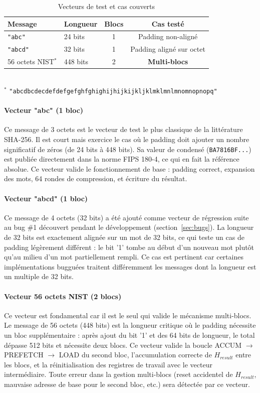 \begin{table}[H]
\centering
\caption{Vecteurs de test et cas couverts}
\label{tab:vectors}
\begin{tabular}{llcc}
\toprule
\textbf{Message} & \textbf{Longueur} & \textbf{Blocs} & \textbf{Cas testé} \\
\midrule
\texttt{"abc"} & 24 bits & 1 & Padding non-aligné \\
\texttt{"abcd"} & 32 bits & 1 & Padding aligné sur octet \\
56 octets NIST$^*$ & 448 bits & 2 & \textbf{Multi-blocs} \\
\bottomrule
\end{tabular}\\[4pt]
{\footnotesize $^*$ \texttt{"abcdbcdecdefdefgefghfghighijhijkijkljklmklmnlmnomnopnopq"}}
\end{table}

\paragraph{Vecteur "abc" (1 bloc)} Ce message de 3 octets est le vecteur de test le plus classique de la littérature SHA-256. Il est court mais exercice le cas où le padding doit ajouter un nombre significatif de zéros (de 24 bits à 448 bits). Sa valeur de condensé (\texttt{BA7816BF...}) est publiée directement dans la norme FIPS 180-4, ce qui en fait la référence absolue. Ce vecteur valide le fonctionnement de base : padding correct, expansion des mots, 64 rondes de compression, et écriture du résultat.

\paragraph{Vecteur "abcd" (1 bloc)} Ce message de 4 octets (32 bits) a été ajouté comme vecteur de régression suite au bug \#1 découvert pendant le développement (section~\ref{sec:bugs}). La longueur de 32 bits est exactement alignée sur un mot de 32 bits, ce qui teste un cas de padding légèrement différent : le bit '1' tombe au début d'un nouveau mot plutôt qu'au milieu d'un mot partiellement rempli. Ce cas est pertinent car certaines implémentations bugguées traitent différemment les messages dont la longueur est un multiple de 32 bits.

\paragraph{Vecteur 56 octets NIST (2 blocs)} Ce vecteur est fondamental car il est le seul qui valide le mécanisme multi-blocs. Le message de 56 octets (448 bits) est la longueur critique où le padding nécessite un bloc supplémentaire : après ajout du bit '1' et des 64 bits de longueur, le total dépasse 512 bits et nécessite deux blocs. Ce vecteur valide la boucle ACCUM $\rightarrow$ PREFETCH $\rightarrow$ LOAD du second bloc, l'accumulation correcte de $H_{result}$ entre les blocs, et la réinitialisation des registres de travail avec le vecteur intermédiaire. Toute erreur dans la gestion multi-blocs (reset accidentel de $H_{result}$, mauvaise adresse de base pour le second bloc, etc.) sera détectée par ce vecteur.


